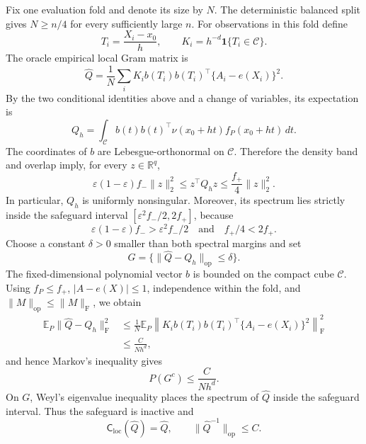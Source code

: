 Fix one evaluation fold and denote its size by \(N\).  The deterministic balanced split gives \(N\geq n/4\) for every sufficiently large \(n\).  For observations in this fold define
\[
T_i=\frac{X_i-x_0}{h},
\qquad
K_i=h^{-d}\mathbf 1\{T_i\in\mathcal C\}.
\]
The oracle empirical local Gram matrix is
\[
\widehat Q
=\frac1N\sum_i K_i b(T_i)b(T_i)^\top\{A_i-e(X_i)\}^2.
\]
By the two conditional identities above and a change of variables, its expectation is
\[
Q_h
=\int_{\mathcal C}b(t)b(t)^\top
\nu(x_0+ht)f_P(x_0+ht)\,dt.
\]
The coordinates of \(b\) are Lebesgue-orthonormal on \(\mathcal C\).  Therefore the density band and overlap imply, for every \(z\in\mathbb R^q\),
\[
\varepsilon(1-\varepsilon)f_-\lVert z\rVert_2^2
\leq z^\top Q_hz
\leq \frac{f_+}{4}\lVert z\rVert_2^2.
\]
In particular, \(Q_h\) is uniformly nonsingular.  Moreover, its spectrum lies strictly inside the safeguard interval \([\varepsilon^2f_-/2,2f_+]\), because
\[
\varepsilon(1-\varepsilon)f_->\varepsilon^2f_-/2
\quad\text{and}\quad
f_+/4<2f_+.
\]
Choose a constant \(\delta>0\) smaller than both spectral margins and set
\[
G=\{\lVert\widehat Q-Q_h\rVert_{\mathrm{op}}\leq\delta\}.
\]
The fixed-dimensional polynomial vector \(b\) is bounded on the compact cube \(\mathcal C\).  Using \(f_P\leq f_+\), \(|A-e(X)|\leq1\), independence within the fold, and \(\lVert M\rVert_{\mathrm{op}}\leq\lVert M\rVert_{\mathrm F}\), we obtain
\[
\begin{aligned}
\mathbb E_P\lVert\widehat Q-Q_h\rVert_{\mathrm F}^2
&\leq \frac{1}{N}\mathbb E_P
 \left\lVert K_i b(T_i)b(T_i)^\top\{A_i-e(X_i)\}^2\right\rVert_{\mathrm F}^2\\
&\leq \frac{C}{Nh^d},
\end{aligned}
\]
and hence Markov's inequality gives
\[
P(G^c)\leq\frac{C}{Nh^d}.
\]
On \(G\), Weyl's eigenvalue inequality places the spectrum of \(\widehat Q\) inside the safeguard interval.  Thus the safeguard is inactive and
\[
\mathsf C_{\mathrm{loc}}(\widehat Q)=\widehat Q,
\qquad
\lVert\widehat Q^{-1}\rVert_{\mathrm{op}}\leq C.
\]

